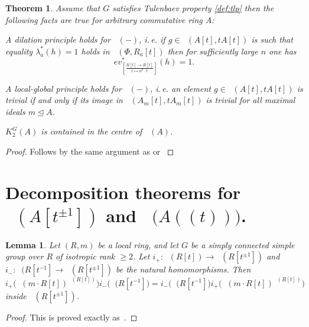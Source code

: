 \documentclass[oneside,12pt]{amsart}
\newtheorem{thm}{Theorem}
\numberwithin{equation}{section}
\newtheorem{lem}{Lemma}
\numberwithin{lem}{section}
\theoremstyle{definition}
\theoremstyle{remark}
\DeclareMathOperator{\St}{St^G}
\newcommand{\eval}[4]{ev_{\scriptstyle \left[\frac{#2[#1] \rightarrow #3}{#1 \mapsto #4}\right]}}
\newcommand{\ev}[3]{\eval{t}{#1}{#2}{#3}}
\begin{document}
\begin{thm} Assume that $G$ satisfies Tulenbaev property \eqref{def:tlp} then the following facts are true for arbitrary commutative ring $A$:
\begin{thmlist}
 \item \label{thm:dp} A dilation principle holds for $\St(-)$, i.\,e. if $g\in\St(A[t], tA[t])$ is such that equality $\lambda_a^*(h) = 1$ holds in $\St(\Phi, R_a[t])$ then
       for sufficiently large $n$ one has $$\ev{R}{R[t]}{a^n\cdot t}^*(h) = 1.$$
 \item \label{thm:lg-k2} A local-global principle holds for $\St(-)$, i.\,e. an element $g \in \St(A[t], tA[t])$ is trivial if and only if its image in 
                         $\St(A_m[t], tA_m[t])$ is trivial for all maximal ideals $m \trianglelefteq A$.
 \item \label{thm:centr} $K_2^G(A)$ is contained in the centre of $\St(A)$.
\end{thmlist}


\end{thm}
\begin{proof} Follows by the same argument as \cite[Theorem~2.1]{Tu} or \cite[Theorem~2]{S15} \end{proof}

\section{Decomposition theorems for \texorpdfstring{$\St(A[t^{\pm 1}])$}{St(A[t, t\textminussuperior\textonesuperior])} and \texorpdfstring{$\St\bigl(A((t))\bigr)$}{St(A((t)))}.}

\begin{lem}
 Let $(R,m)$ be a local ring, and let $G$ be a simply connected simple group over $R$
of isotropic rank $\ge 2$. Let $i_+:\St(R[t])\to\St(R[t^{\pm 1}])$ and $i_-:\St(R[t^{-1}]\to
\St(R[t^{\pm 1}])$ be the natural homomorphisms.
Then
$$
i_+\bigl(\St(m\cdot R[t])^{\St(R[t])}\bigr)i_-\bigl(\St(R[t^{-1}]\bigr)=i_-\bigl(\St(R[t^{-1}]\bigr)
i_+\bigl(\St(m\cdot R[t])^{\St(R[t])}\bigr)
$$
inside $\St(R[t^{\pm 1}])$.
\end{lem}
\begin{proof}
This is proved exactly as~\cite[Lemma 5.12]{St-poly}.
\end{proof}
\end{document}
